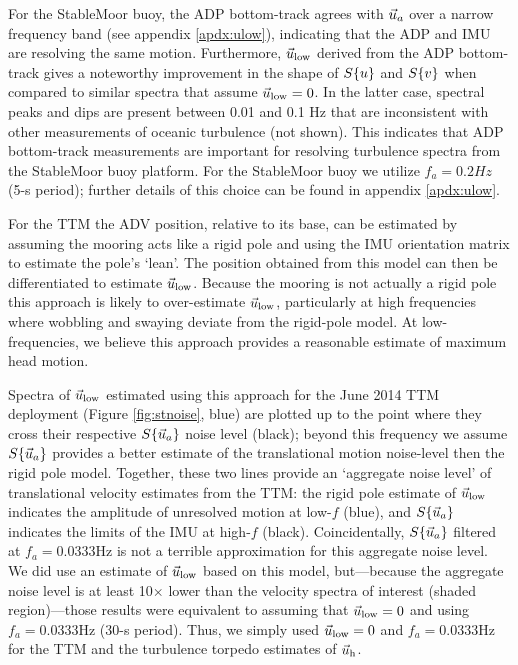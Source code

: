 For the StableMoor buoy, the ADP bottom-track agrees with $\vec{u}_a$ over a narrow frequency band (see appendix \ref{apdx:ulow}), indicating that the ADP and IMU are resolving the same motion. Furthermore, $\vec{u}_\mathrm{low}$ derived from the ADP bottom-track gives a noteworthy improvement in the shape of $S\{u\}$ and $S\{v\}$ when compared to similar spectra that assume $\vec{u}_\mathrm{low}=0$. In the latter case, spectral peaks and dips are present between 0.01 and 0.1 Hz that are inconsistent with other measurements of oceanic turbulence (not shown). This indicates that ADP bottom-track measurements are important for resolving turbulence spectra from the StableMoor buoy platform. For the StableMoor buoy we utilize $f_a = 0.2 Hz$ (5-s period); further details of this choice can be found in appendix \ref{apdx:ulow}.

For the TTM the ADV position, relative to its base, can be estimated by assuming the mooring acts like a rigid pole and using the IMU orientation matrix to estimate the pole's `lean'. The position obtained from this model can then be differentiated to estimate $\vec{u}_\mathrm{low}$. Because the mooring is not actually a rigid pole this approach is likely to over-estimate $\vec{u}_\mathrm{low}$, particularly at high frequencies where wobbling and swaying deviate from the rigid-pole model. At low-frequencies, we believe this approach provides a reasonable estimate of maximum head motion.

Spectra of $\vec{u}_\mathrm{low}$ estimated using this approach for the June 2014 TTM deployment (Figure \ref{fig:stnoise}, blue) are plotted up to the point where they cross their respective $S\{\vec{u}_a\}$ noise level (black); beyond this frequency we assume $S\{\vec{u}_a\}$ provides a better estimate of the translational motion noise-level then the rigid pole model.  Together, these two lines provide an `aggregate noise level' of translational velocity estimates from the TTM: the rigid pole estimate of $\vec{u}_\mathrm{low}$ indicates the amplitude of unresolved motion at low-$f$ (blue), and $S\{\vec{u}_a\}$ indicates the limits of the IMU at high-$f$ (black). Coincidentally, $S\{\vec{u}_a\}$ filtered at $f_a = 0.0333$Hz is not a terrible approximation for this aggregate noise level. We did use an estimate of $\vec{u}_\mathrm{low}$ based on this model, but---because the aggregate noise level is at least 10$\times$ lower than the velocity spectra of interest (shaded region)---those results were equivalent to assuming that $\vec{u}_\mathrm{low} = 0$ and using $f_a = 0.0333$Hz (30-s period). Thus, we simply used $\vec{u}_\mathrm{low}=0$ and $f_a=0.0333$Hz for the TTM and the turbulence torpedo estimates of $\vec{u}_\mathrm{h}$.

